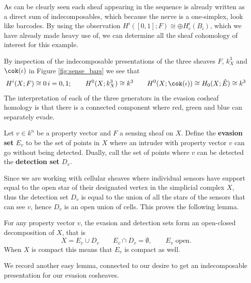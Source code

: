 As can be clearly seen each sheaf appearing in the sequence is already written as a direct sum of indecomposables, which because the nerve is a one-simplex, look like barcodes. By using the observation $H^i([0,1];F)\cong \oplus H^i_c(B_i)$, which we have already made heavy use of, we can determine all the sheaf cohomology of interest for this example.

\begin{ex}
	By inspection of the indecomposable presentations of the three sheaves $F$, $k^3_X$ and $\cok(\iota)$ in Figure \ref{fig:sense_bars} we see that
	\[
	H^i(X;F)\cong 0 \, i=0,1; \qquad H^0(X;k^3_X)\cong k^3 \qquad H^0(X;\cok(\iota))\cong H_0(X;\hat{E})\cong k^3 
 	\]
The interpretation of each of the three generators in the evasion cosheaf homology is that there is a connected component where red, green and blue can separately evade.
\end{ex}

\begin{defn}
	Let $v\in k^n$ be a property vector and $F$ a sensing sheaf on $X$. Define the \textbf{evasion set} $E_v$ to be the set of points in $X$ where an intruder with property vector $v$ can go without being detected. Dually, call the set of points where $v$ can be detected the \textbf{detection set} $D_v$.
\end{defn}

Since we are working with cellular sheaves where individual sensors have support equal to the open star of their designated vertex in the simplicial complex $X$, thus the detection set $D_v$ is equal to the union of all the stars of the sensors that can see $v$, hence $D_v$ is an open union of cells. This proves the following lemma.

\begin{lem}
	For any property vector $v$, the evasion and detection sets form an open-closed decomposition of $X$, that is
	\[
		X=E_v\cup D_v \qquad E_v\cap D_v=\emptyset, \qquad E_v \,\, \mathrm{open}.
	\]
	When $X$ is compact this means that $E_v$ is compact as well.
\end{lem}

We record another easy lemma, connected to our desire to get an indecomposable presentation for our evasion cosheaves.

